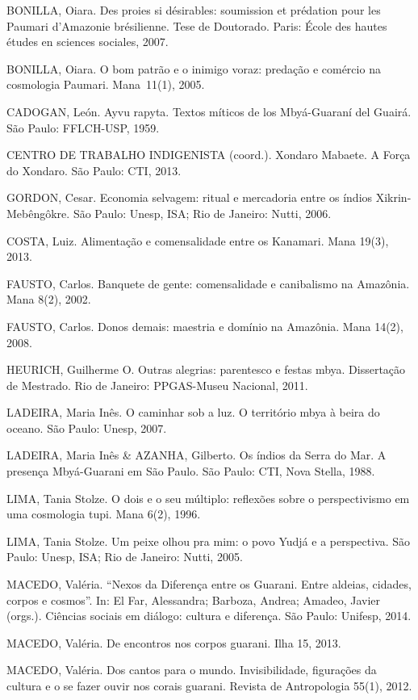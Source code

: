 BONILLA, Oiara. Des proies si désirables: soumission et prédation pour
les Paumari d’Amazonie br\'{e}silienne. Tese de Doutorado.  Paris:
École des hautes études en sciences sociales, 2007.

BONILLA, Oiara. O bom patrão e o inimigo voraz: predação e comércio na
cosmologia Paumari. Mana~11(1), 2005.

CADOGAN, León. Ayvu rapyta. Textos míticos de los Mbyá-Guaraní del
Guairá. São Paulo: FFLCH-USP, 1959.

CENTRO DE TRABALHO INDIGENISTA (coord.). Xondaro Mabaete. A Força do
Xondaro. São Paulo: CTI, 2013.

GORDON, Cesar. Economia selvagem: ritual e mercadoria entre os índios
Xikrin-Mebêngôkre. São Paulo: Unesp, ISA; Rio de Janeiro: Nutti, 2006.

COSTA, Luiz. Alimentação e comensalidade entre os Kanamari. Mana 19(3),
2013.

FAUSTO, Carlos. Banquete de gente: comensalidade e canibalismo na
Amazônia. Mana 8(2), 2002.

FAUSTO, Carlos. Donos demais: maestria e domínio na Amazônia. Mana
14(2), 2008.

HEURICH, Guilherme O. Outras alegrias: parentesco e festas mbya.
Dissertação de Mestrado. Rio de Janeiro: PPGAS-Museu Nacional, 2011.

LADEIRA, Maria Inês. O caminhar sob a luz. O território mbya à beira do
oceano. São Paulo: Unesp, 2007.

LADEIRA, Maria Inês \& AZANHA, Gilberto. Os índios da Serra do Mar. A
presença Mbyá-Guarani em São Paulo. São Paulo: CTI, Nova Stella, 1988.

LIMA, Tania Stolze. O dois e o seu múltiplo: reflexões sobre o
perspectivismo em uma cosmologia tupi. Mana 6(2), 1996.

LIMA, Tania Stolze. Um peixe olhou pra mim: o povo Yudjá e a
perspectiva. São Paulo: Unesp, ISA; Rio de Janeiro: Nutti, 2005.

MACEDO, Valéria. ``Nexos da Diferença entre os Guarani. Entre aldeias,
cidades, corpos e cosmos''. In: El Far, Alessandra; Barboza, Andrea;
Amadeo, Javier (orgs.). Ciências sociais em diálogo: cultura e
diferença. São Paulo: Unifesp, 2014.

MACEDO, Valéria. De encontros nos corpos guarani. Ilha 15, 2013.

MACEDO, Valéria. Dos cantos para o mundo. Invisibilidade, figurações da
cultura e o se fazer ouvir nos corais guarani. Revista de Antropologia
55(1), 2012.

